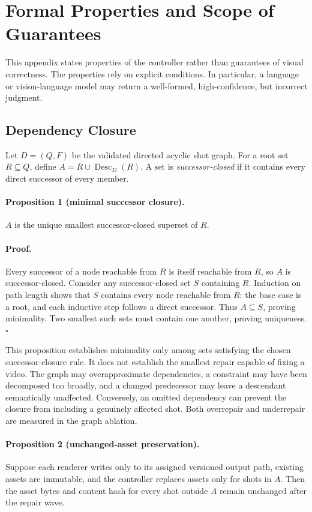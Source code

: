 \section{Formal Properties and Scope of Guarantees}
\label{app:formal}

This appendix states properties of the controller rather than guarantees of
visual correctness. The properties rely on explicit conditions. In
particular, a language or vision-language model may return a well-formed,
high-confidence, but incorrect judgment.

\subsection{Dependency Closure}

Let $D=(Q,F)$ be the validated directed acyclic shot graph. For a root set
$R\subseteq Q$, define $A=R\cup\operatorname{Desc}_D(R)$. A set is
\emph{successor-closed} if it contains every direct successor of every member.

\paragraph{Proposition 1 (minimal successor closure).}
$A$ is the unique smallest successor-closed superset of $R$.

\paragraph{Proof.}
Every successor of a node reachable from $R$ is itself reachable from $R$,
so $A$ is successor-closed. Consider any successor-closed set $S$ containing
$R$. Induction on path length shows that $S$ contains every node reachable
from $R$: the base case is a root, and each inductive step follows a direct
successor. Thus $A\subseteq S$, proving minimality. Two smallest such sets
must contain one another, proving uniqueness.\hfill$\square$

This proposition establishes minimality only among sets satisfying the
chosen successor-closure rule. It does not establish the smallest repair
capable of fixing a video. The graph may overapproximate dependencies, a
constraint may have been decomposed too broadly, and a changed predecessor
may leave a descendant semantically unaffected. Conversely, an omitted
dependency can prevent the closure from including a genuinely affected shot.
Both overrepair and underrepair are measured in the graph ablation.

\paragraph{Proposition 2 (unchanged-asset preservation).}
Suppose each renderer writes only to its assigned versioned output path,
existing assets are immutable, and the controller replaces assets only for
shots in $A$. Then the asset bytes and content hash for every shot outside
$A$ remain unchanged after the repair wave.

